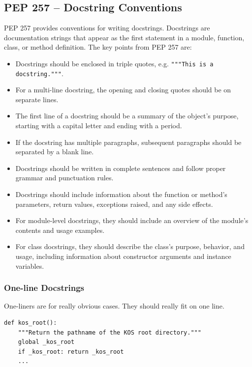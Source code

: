 
\newpage
\subsection{PEP 257 – Docstring Conventions}
PEP 257 provides conventions for writing docstrings. Docstrings are documentation strings that appear as the first statement in a module, function, class, or method definition. The key points from PEP 257 are:

\begin{itemize}
    \item Docstrings should be enclosed in triple quotes, e.g. \texttt{"""This is a docstring."""}.
    \item For a multi-line docstring, the opening and closing quotes should be on separate lines.
    \item The first line of a docstring should be a summary of the object's purpose, starting with a capital letter and ending with a period.
    \item If the docstring has multiple paragraphs, subsequent paragraphs should be separated by a blank line.
    \item Docstrings should be written in complete sentences and follow proper grammar and punctuation rules.
    \item Docstrings should include information about the function or method's parameters, return values, exceptions raised, and any side effects.
    \item For module-level docstrings, they should include an overview of the module's contents and usage examples.
    \item For class docstrings, they should describe the class's purpose, behavior, and usage, including information about constructor arguments and instance variables.
\end{itemize}

\subsubsection{One-line Docstrings}
One-liners are for really obvious cases. They should really fit on one line.
\begin{codebox}
\begin{verbatim}
def kos_root():
    """Return the pathname of the KOS root directory."""
    global _kos_root
    if _kos_root: return _kos_root
    ...
\end{verbatim}
\end{codebox}

